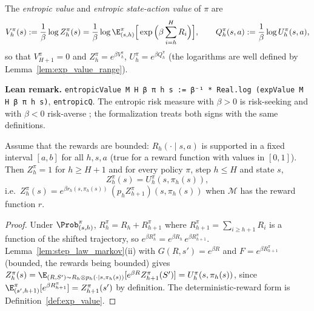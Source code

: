 \begin{definition}\label{def:entropic_value}
\leanok
{}
The \emph{entropic value} and \emph{entropic state-action value} of $\pi$ are
\[
  V^\pi_h(s) := \frac1\beta \log Z^\pi_h(s)
  = \frac1\beta \log \E^\pi_{(s, h)}\Big[\exp\Big(\beta \sum_{i = h}^H R_i\Big)\Big],
  \qquad
  Q^\pi_h(s, a) := \frac1\beta \log U^\pi_h(s, a) ,
\]
so that $V^\pi_{H+1} = 0$ and $Z^\pi_h = e^{\beta V^\pi_h}$, $U^\pi_h = e^{\beta Q^\pi_h}$ (the
logarithms are well defined by Lemma~\ref{lem:exp_value_range}).
\end{definition}

\textbf{Lean remark.} \texttt{entropicValue M H β π h s := β⁻¹ * Real.log (expValue M H β π h s)},
\texttt{entropicQ}. The entropic risk measure with $\beta > 0$ is risk-seeking and with
$\beta < 0$ risk-averse \cite{borkar2001risk}; the formalization treats both signs with the
same definitions.

\begin{lemma}\label{lem:exp_bellman}
\leanok
{}
Assume that the rewards are bounded: $R_h(\cdot \mid s, a)$ is supported in a fixed interval
$[a, b]$ for all $h, s, a$ (true for a reward function with values in $[0, 1]$). Then
$Z^\pi_{h} = 1$ for $h \ge H + 1$ and for every policy $\pi$, step $h \le H$ and state $s$,
\[
  Z^\pi_h(s) = U^\pi_h(s, \pi_h(s)),
\]
i.e.\ $Z^\pi_h(s) = e^{\beta r_h(s, \pi_h(s))}\,(p_h Z^\pi_{h+1})(s, \pi_h(s))$ when $\mathcal M$
has the reward function $r$.
\end{lemma}

\begin{proof}
\leanok
Under $\Prob^\pi_{(s, h)}$, $R^\pi_h = R_h + R^\pi_{h+1}$ where $R^\pi_{h+1} = \sum_{i \ge h+1} R_i$
is a function of the shifted trajectory, so
$e^{\beta R^\pi_h} = e^{\beta R_h}\, e^{\beta R^\pi_{h+1}}$. Lemma~\ref{lem:step_law_markov}(ii) with
$G(R, s') = e^{\beta R}$ and $F = e^{\beta R^\pi_{h+1}}$ (bounded, the rewards being bounded)
gives
$Z^\pi_h(s) = \E_{(R, S') \sim R_h \otimes p_h(\cdot \mid s, \pi_h(s))}[e^{\beta R} Z^\pi_{h+1}(S')]
= U^\pi_h(s, \pi_h(s))$, since $\E^\pi_{(s', h+1)}[e^{\beta R^\pi_{h+1}}] = Z^\pi_{h+1}(s')$ by
definition. The deterministic-reward form is Definition~\ref{def:exp_value}.
\end{proof}

